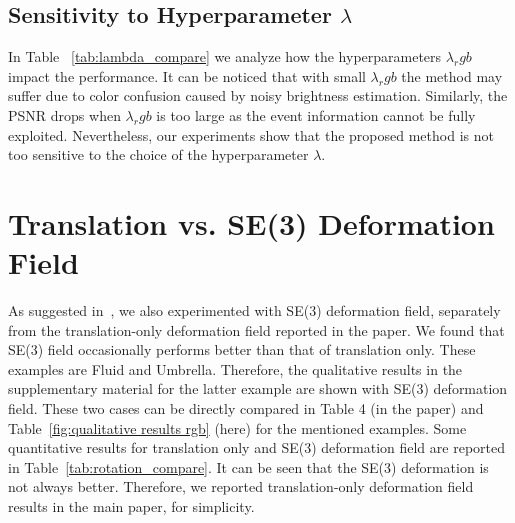 \documentclass[10pt,twocolumn,letterpaper]{article}
\begin{document}




\subsection{ Sensitivity to Hyperparameter $\lambda$}
In Table ~\ref{tab:lambda_compare} we analyze how the hyperparameters $\lambda_rgb$ impact the performance. It can be noticed that with small $\lambda_rgb$ the method may suffer due to color confusion caused by noisy brightness estimation. Similarly, the PSNR drops when $\lambda_rgb$ is too large as the event information cannot be fully exploited. Nevertheless, our experiments show that the proposed method is not too sensitive to the choice of the hyperparameter $\lambda$.





\section{Translation vs. SE(3)  Deformation Field}
As suggested in~\cite{park2021nerfies}, we also experimented with SE(3)  deformation field, separately from the translation-only deformation field reported in the paper.
We found that SE(3) field occasionally performs better than that of translation only. These examples are Fluid and Umbrella. Therefore, the qualitative results in the supplementary material for the latter example are shown with SE(3) deformation field. These two cases can be directly compared in Table 4 (in the paper) and Table~\ref{fig:qualitative results rgb} (here) for the mentioned examples. Some quantitative results for translation only and SE(3) deformation field are reported in Table~\ref{tab:rotation_compare}. It can be seen that the SE(3) deformation is not always better. Therefore, we reported translation-only deformation field results in the main paper, for simplicity. 


\end{document}
